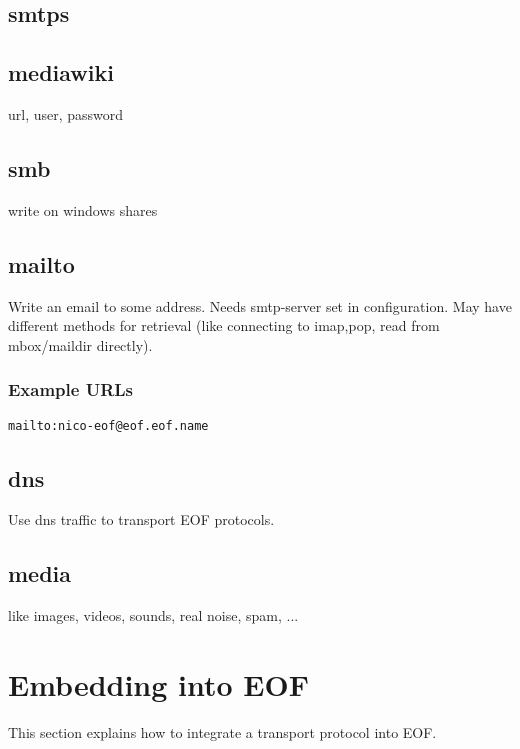 \documentclass[12pt,a4paper]{book}
\begin{document}
\subsection{smtps}
\subsection{mediawiki}
url, user, password
\subsection{smb}
write on windows shares
\subsection{mailto}
Write an email to some address. Needs smtp-server set in configuration.
May have different methods for retrieval (like connecting to imap,pop,
read from mbox/maildir directly).
\subsubsection{Example URLs}
\begin{verbatim}
mailto:nico-eof@eof.eof.name
\end{verbatim}
\subsection{dns}
Use dns traffic to transport EOF protocols.
\subsection{media}
like images, videos, sounds, real noise, spam, ...
\section{Embedding into EOF}
This section explains how to integrate a transport protocol into EOF.
\end{document}
